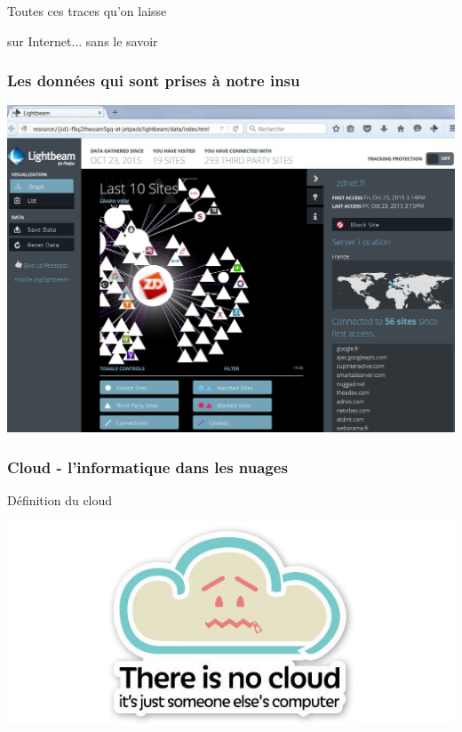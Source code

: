 \documentclass{beamer}
\begin{document}
\begin{frame}
\Huge{\centerline{Toutes ces traces qu'on laisse}}
\Huge{\centerline{sur Internet... sans le savoir}}
\end{frame}

\begin{frame}
\frametitle{Les données qui sont prises à notre insu}
\includegraphics[scale=0.45] {./images/Lightbeam.jpg} 
\end{frame}

\begin{frame}
\frametitle{Cloud - l'informatique dans les nuages}
\begin{block}{Définition du cloud}
\begin{center}
\includegraphics[scale=0.5] {./images/cloud.png} 
\end{center}
\end{block}
\end{frame}
\end{document}
